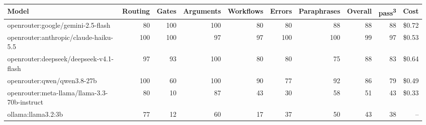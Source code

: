 \begin{tabular}{lrrrrrrrrr}
\toprule
Model & Routing & Gates & Arguments & Workflows & Errors & Paraphrases & Overall & pass\textsuperscript{3} & Cost \\
\midrule
openrouter:google/gemini-2.5-flash & 80 & 100 & 100 & 80 & 80 & 88 & 88 & 88 & \$0.72 \\
openrouter:anthropic/claude-haiku-5.5 & 100 & 100 & 97 & 97 & 100 & 100 & 99 & 97 & \$0.53 \\
openrouter:deepseek/deepseek-v4.1-flash & 97 & 93 & 100 & 80 & 80 & 75 & 88 & 83 & \$0.64 \\
openrouter:qwen/qwen3.8-27b & 100 & 60 & 100 & 90 & 77 & 92 & 86 & 79 & \$0.49 \\
openrouter:meta-llama/llama-3.3-70b-instruct & 80 & 10 & 87 & 43 & 30 & 58 & 51 & 43 & \$0.33 \\
ollama:llama3.2:3b & 77 & 12 & 60 & 17 & 37 & 50 & 43 & 38 & -- \\
\bottomrule
\end{tabular}

